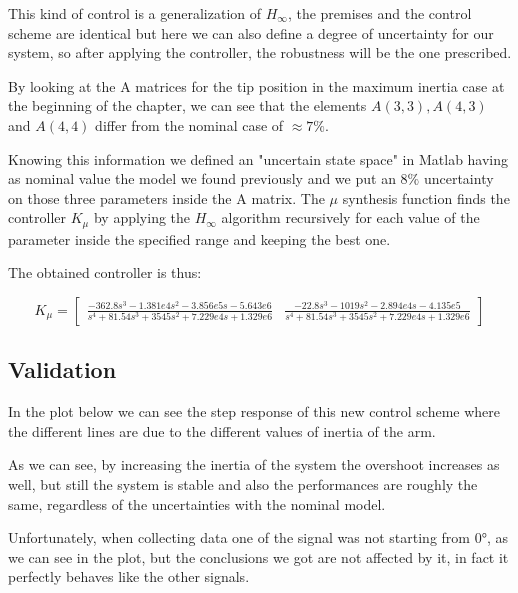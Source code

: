 This kind of control is a generalization of $H_\infty$, the premises and the control scheme are identical but here we can also define a degree of uncertainty for our system, so after applying the controller, the robustness will be the one prescribed.

By looking at the A matrices for the tip position in the maximum inertia case at the beginning of the chapter, we can see that the elements $A(3,3), A(4,3)$ and $A(4,4)$ differ from the nominal case of $\approx 7\%$.

Knowing this information we defined an "uncertain state space" in Matlab having as nominal value the model we found previously and we put an $8\%$ uncertainty on those three parameters inside the A matrix. The $\mu$ synthesis function finds the controller $K_\mu$ by applying the $H_\infty$ algorithm recursively for each value of the parameter inside the specified range and keeping the best one.  

The obtained controller is thus:

\begin{equation*}
    K_\mu= \begin{bmatrix}
        \frac{-362.8 s^3-1.381e4 s^2 - 3.856 e5 s - 5.643 e 6}{s^4 + 81.54 s^3 +3545s^2+7.229e4s+1.329e6}   &
        \frac{-22.8s^3-1019s^2-2.894e4s-4.135e5}{s^4 + 81.54 s^3 +3545s^2+7.229e4s+1.329e6}
    \end{bmatrix}
\end{equation*}

\subsection{Validation}

In the plot below we can see the step response of this new control scheme where the different lines are due to the different values of inertia of the arm. 


 As we can see, by increasing the inertia of the system the overshoot increases as well, but still the system is stable and also the performances are roughly the same, regardless of the uncertainties with the nominal model. 

 Unfortunately, when collecting data one of the signal was not starting from 0°, as we can see in the plot, but the conclusions we got are not affected by it, in fact it perfectly behaves like the other signals.
